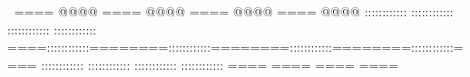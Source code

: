 ====    @@@@        ====    @@@@        ====    @@@@        ====    @@@@            ::::::::::::        ::::::::::::        ::::::::::::        ::::::::::::    ====::::::::::::========::::::::::::========::::::::::::========::::::::::::====    ::::::::::::        ::::::::::::        ::::::::::::        ::::::::::::                    ====                ====                ====                ==== 